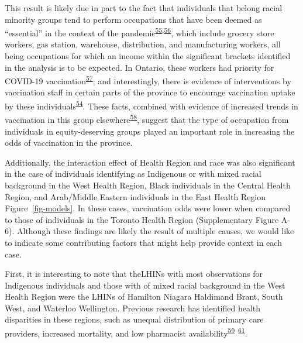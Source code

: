 \documentclass[
  letterpaper,
  DIV=11,
  numbers=noendperiod]{scrartcl}
\begin{document}
This result is likely due in part to the fact that individuals that
belong racial minority groups tend to perform occupations that have been
deemed as ``essential'' in the context of the
pandemic\textsuperscript{\protect\hyperlink{ref-hawkins2020}{55},\protect\hyperlink{ref-ct2021}{56}},
which include grocery store workers, gas station, warehouse,
distribution, and manufacturing workers, all being occupations for which
an income within the significant brackets identified in the analysis is
to be expected. In Ontario, these workers had priority for COVID-19
vaccination\textsuperscript{\protect\hyperlink{ref-mishra2021}{57}}; and
interestingly, there is evidence of interventions by vaccination staff
in certain parts of the province to encourage vaccination uptake by
these individuals\textsuperscript{\protect\hyperlink{ref-gill2022}{54}}.
These facts, combined with evidence of increased trends in vaccination
in this group
elsewhere\textsuperscript{\protect\hyperlink{ref-nguyen2021b}{58}},
suggest that the type of occupation from individuals in equity-deserving
groups played an important role in increasing the odds of vaccination in
the province.

Additionally, the interaction effect of Health Region and race was also
significant in the case of individuals identifying as Indigenous or with
mixed racial background in the West Health Region, Black individuals in
the Central Health Region, and Arab/Middle Eastern individuals in the
East Health Region Figure~\ref{fig-models}. In these cases, vaccination
odds were lower when compared to those of individuals in the Toronto
Health Region (Supplementary Figure A-6). Although these findings are
likely the result of multiple causes, we would like to indicate some
contributing factors that might help provide context in each case.

First, it is interesting to note that theLHINs with most observations
for Indigenous individuals and those with of mixed racial background in
the West Health Region were the LHINs of Hamilton Niagara Haldimand
Brant, South West, and Waterloo Wellington. Previous research has
identified health disparities in these regions, such as unequal
distribution of primary care providers, increased mortality, and low
pharmacist
availability\textsuperscript{\protect\hyperlink{ref-shah2019}{59}--\protect\hyperlink{ref-timony2022}{61}}.
\end{document}
